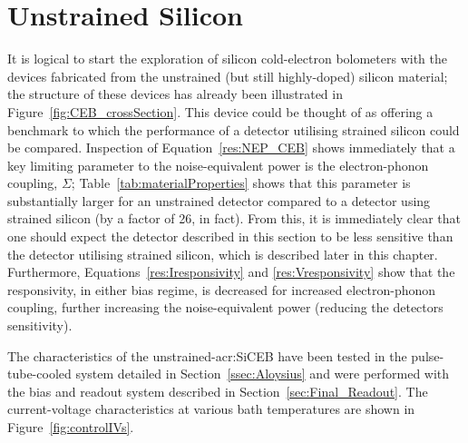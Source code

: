 \section{Unstrained Silicon}\label{sec:darkControlSi}
It is logical to start the exploration of silicon cold-electron bolometers with the devices fabricated from the unstrained (but still highly-doped) silicon material; the structure of these devices has already been illustrated in Figure~\ref{fig:CEB_crossSection}. This device could be thought of as offering a benchmark to which the performance of a detector utilising strained silicon could be compared. Inspection of Equation~\ref{res:NEP_CEB} shows immediately that a key limiting parameter to the noise-equivalent power is the electron-phonon coupling, $\varSigma$; Table~\ref{tab:materialProperties} shows that this parameter is substantially larger for an unstrained detector compared to a detector using strained silicon (by a factor of 26, in fact). From this, it is immediately clear that one should expect the detector described in this section to be less sensitive than the detector utilising strained silicon, which is described later in this chapter. Furthermore, Equations~\ref{res:Iresponsivity} and \ref{res:Vresponsivity} show that the responsivity, in either bias regime, is decreased for increased electron-phonon coupling, further increasing the noise-equivalent power (reducing the detectors sensitivity).
\par 
The  characteristics of the unstrained-\gls{acr:SiCEB} have been tested in the pulse-tube-cooled system detailed in Section~\ref{ssec:Aloysius} and were performed with the bias and readout system described in Section~\ref{sec:Final_Readout}. The current-voltage characteristics at various bath temperatures are shown in Figure~\ref{fig:controlIVs}.
